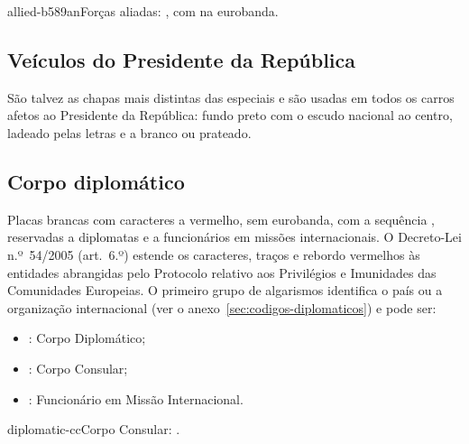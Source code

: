 %
          {allied-b589an}{Forças aliadas: , com  na eurobanda.}

\subsection{Veículos do Presidente da República}

São talvez as chapas mais distintas das especiais e são usadas em todos os carros
afetos ao Presidente da República: fundo preto com o escudo nacional ao centro,
ladeado pelas letras  e  a branco ou prateado.


\subsection{Corpo diplomático}\label{sec:diplomaticos}

Placas brancas com caracteres a vermelho, sem eurobanda, com a sequência
, reservadas a diplomatas e a funcionários em missões
internacionais. O Decreto-Lei n.º~54/2005 (art.~6.º) estende os caracteres, traços
e rebordo vermelhos às entidades abrangidas pelo Protocolo relativo aos Privilégios
e Imunidades das Comunidades Europeias. O primeiro grupo de algarismos identifica o país ou a
organização internacional (ver o anexo~\ref{sec:codigos-diplomaticos}) e
 pode ser:
\begin{itemize}
  \item {}: Corpo Diplomático;
  \item {}: Corpo Consular;
  \item {}: Funcionário em Missão Internacional.
\end{itemize}

%
          {diplomatic-cc}{Corpo Consular: .}
